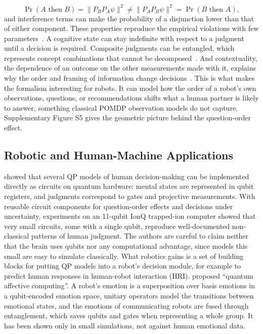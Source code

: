 \documentclass[acmsmall,screen,review]{acmart}
\begin{document}
\begin{equation}
\Pr(A\text{ then }B)=\lVert P_B P_A\psi\rVert^2 \neq \lVert P_A P_B\psi\rVert^2=\Pr(B\text{ then }A),
\end{equation}
and interference terms can make the probability of a disjunction lower than that of either component. These properties reproduce the empirical violations with few parameters~\cite{Pothos2013,Pothos2022}. A cognitive state can stay indefinite with respect to a judgment until a decision is required. Composite judgments can be entangled, which represents concept combinations that cannot be decomposed~\cite{Busemeyer2012}. And contextuality, the dependence of an outcome on the other measurements made with it, explains why the order and framing of information change decisions~\cite{Pothos2022}. This is what makes the formalism interesting for robots. It can model how the order of a robot's own observations, questions, or recommendations shifts what a human partner is likely to answer, something classical POMDP observation models do not capture. Supplementary Figure S5 gives the geometric picture behind the question-order effect.



\subsection{Robotic and Human-Machine Applications}\label{sec:cog-apps}
\citet{Widdows2023} showed that several QP models of human decision-making can be implemented directly as circuits on quantum hardware: mental states are represented in qubit registers, and judgments correspond to gates and projective measurements. With reusable circuit components for question-order effects and decisions under uncertainty, experiments on an 11-qubit IonQ trapped-ion computer showed that very small circuits, some with a single qubit, reproduce well-documented non-classical patterns of human judgment. The authors are careful to claim neither that the brain uses qubits nor any computational advantage, since models this small are easy to simulate classically. What robotics gains is a set of building blocks for putting QP models into a robot's decision module, for example to predict human responses in human-robot interaction (HRI). \citet{Yan2021} proposed ``quantum affective computing''. A robot's emotion is a superposition over basis emotions in a qubit-encoded emotion space, unitary operators model the transitions between emotional states, and the emotions of communicating robots are fused through entanglement, which saves qubits and gates when representing a whole group. It has been shown only in small simulations, not against human emotional data.
\end{document}
